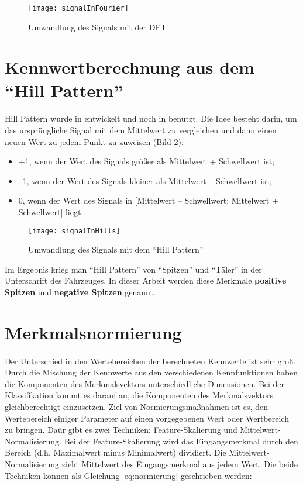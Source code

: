 \begin{figure}[ht]
\centering
\texttt{[image: signalInFourier]}
\caption{Umwandlung des Signals mit der DFT}
\label{fig:signalFourier}
\end{figure}

\section{Kennwertberechnung aus dem ``Hill Pattern''}

\paragraph{}
Hill Pattern wurde in \cite{hills} entwickelt und noch in \cite{saowaluck} benutzt. Die Idee besteht darin, um  das urspr\"ungliche Signal mit dem Mittelwert zu vergleichen und dann einen neuen Wert zu jedem Punkt zu zuweisen (Bild \ref{fig:signalHills}):

\begin{itemize}
\item +1, wenn der Wert des Signals gr\"o\ss{}er als Mittelwert + Schwellwert ist;
\item --1, wenn der Wert des Signals kleiner als Mittelwert -- Schwellwert ist;
\item 0, wenn der Wert des Signals in [Mittelwert -- Schwellwert; Mittelwert + Schwellwert] liegt.
\end{itemize}

\begin{figure}[ht]
\centering
\texttt{[image: signalInHills]}
\caption{Umwandlung des Signals mit dem ``Hill Pattern''}
\label{fig:signalHills}
\end{figure}

Im Ergebnis krieg man ``Hill Pattern'' von ``Spitzen'' und ``T\"aler'' in der Unterschrift des Fahrzeuges. In dieser Arbeit werden diese Merkmale \textbf{positive Spitzen} und \textbf{negative Spitzen} genannt.

\section{Merkmalsnormierung}
\paragraph{}
Der Unterschied in den Wertebereichen der berechneten Kennwerte ist sehr gro\ss{}. Durch die Mischung der Kennwerte aus den verschiedenen Kennfunktionen haben die Komponenten des Merkmalsvektors unterschiedliche Dimensionen. Bei der Klassifikation kommt es darauf an, die Komponenten des Merkmalsvektors gleichberechtigt einzusetzen. Ziel von Normierungsma\ss{}nahmen ist es, den Wertebereich einiger Parameter auf einen vorgegebenen Wert oder Wertbereich zu bringen. Da\"ur gibt es zwei Techniken: Feature-Skalierung und Mittelwert-Normalisierung. Bei der Feature-Skalierung wird das Eingangsmerkmal durch den Bereich (d.h. Maximalwert minus Minimalwert) dividiert. Die Mittelwert-Normalisierung zieht Mittelwert des Eingangsmerkmal aus jedem Wert. Die beide Techniken k\"onnen als Gleichung \ref{eq:normierung} geschrieben werden:

